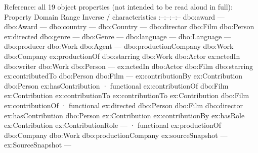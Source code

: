 \documentclass[
  11pt,
]{article}
\begin{document}
Reference: all 19 object properties (not intended to be read aloud in
full): \textbar{} Property \textbar{} Domain \textbar{} Range \textbar{}
Inverse / characte\allowbreak{}ristics \textbar{}
\textbar:--\textbar:--\textbar:--\textbar:--\textbar{} \textbar{}
dbo:award \textbar{} --- \textbar{} dbo:Award \textbar{} --- \textbar{}
\textbar{} dbo:country \textbar{} --- \textbar{} dbo:Country \textbar{}
--- \textbar{} \textbar{} dbo:director \textbar{} dbo:Film \textbar{}
dbo:Person \textbar{} ex:directed \textbar{} \textbar{} dbo:genre
\textbar{} --- \textbar{} dbo:Genre \textbar{} --- \textbar{} \textbar{}
dbo:language \textbar{} --- \textbar{} dbo:Language \textbar{} ---
\textbar{} \textbar{} dbo:producer \textbar{} dbo:Work \textbar{}
dbo:Agent \textbar{} --- \textbar{} \textbar{}
dbo:\allowbreak{}prod\allowbreak{}uction\allowbreak{}Co\allowbreak{}mpany
\textbar{} dbo:Work \textbar{} dbo:Company \textbar{}
ex:\allowbreak{}produ\allowbreak{}ction\allowbreak{}Of \textbar{}
\textbar{} dbo:starring \textbar{} dbo:Work \textbar{} dbo:Actor
\textbar{} ex:actedIn \textbar{} \textbar{} dbo:writer \textbar{}
dbo:Work \textbar{} dbo:Person \textbar{} --- \textbar{} \textbar{}
ex:actedIn \textbar{} dbo:Actor \textbar{} dbo:Film \textbar{}
dbo:starring \textbar{} \textbar{}
ex:\allowbreak{}contr\allowbreak{}ibuted\allowbreak{}To\allowbreak{}
\textbar{} dbo:Person \textbar{} dbo:Film \textbar{} --- \textbar{}
\textbar{}
ex:\allowbreak{}contr\allowbreak{}ibution\allowbreak{}B\allowbreak{}y
\textbar{} ex:\allowbreak{}\allowbreak{}Contr\allowbreak{}ibution
\textbar{} dbo:Person \textbar{}
ex:\allowbreak{}has\allowbreak{}Co\allowbreak{}ntributi\allowbreak{}on ·
functional \textbar{} \textbar{}
ex:\allowbreak{}contr\allowbreak{}ibution\allowbreak{}O\allowbreak{}f
\textbar{} dbo:Film \textbar{}
ex:\allowbreak{}\allowbreak{}Contr\allowbreak{}ibution \textbar{}
ex:\allowbreak{}contr\allowbreak{}ibution\allowbreak{}T\allowbreak{}o
\textbar{} \textbar{}
ex:\allowbreak{}contr\allowbreak{}ibution\allowbreak{}T\allowbreak{}o
\textbar{} ex:\allowbreak{}\allowbreak{}Contr\allowbreak{}ibution
\textbar{} dbo:Film \textbar{}
ex:\allowbreak{}contr\allowbreak{}ibution\allowbreak{}O\allowbreak{}f ·
functional \textbar{} \textbar{} ex:directed \textbar{} dbo:Person
\textbar{} dbo:Film \textbar{} dbo:director \textbar{} \textbar{}
ex:\allowbreak{}has\allowbreak{}Co\allowbreak{}ntributi\allowbreak{}on
\textbar{} dbo:Person \textbar{}
ex:\allowbreak{}\allowbreak{}Contr\allowbreak{}ibution \textbar{}
ex:\allowbreak{}contr\allowbreak{}ibution\allowbreak{}B\allowbreak{}y
\textbar{} \textbar{} ex:hasRole \textbar{}
ex:\allowbreak{}\allowbreak{}Contr\allowbreak{}ibution \textbar{}
ex:\allowbreak{}\allowbreak{}Contr\allowbreak{}ibution\allowbreak{}R\allowbreak{}ole
\textbar{} --- · functional \textbar{} \textbar{}
ex:\allowbreak{}produ\allowbreak{}ction\allowbreak{}Of \textbar{}
dbo:Company \textbar{} dbo:Work \textbar{}
dbo:\allowbreak{}prod\allowbreak{}uction\allowbreak{}Co\allowbreak{}mpany
\textbar{} \textbar{}
ex:\allowbreak{}sourc\allowbreak{}e\allowbreak{}Snapsho\allowbreak{}t
\textbar{} --- \textbar{}
ex:\allowbreak{}\allowbreak{}Sourc\allowbreak{}e\allowbreak{}Snapsho\allowbreak{}t
\textbar{} --- \textbar{}
\end{document}
